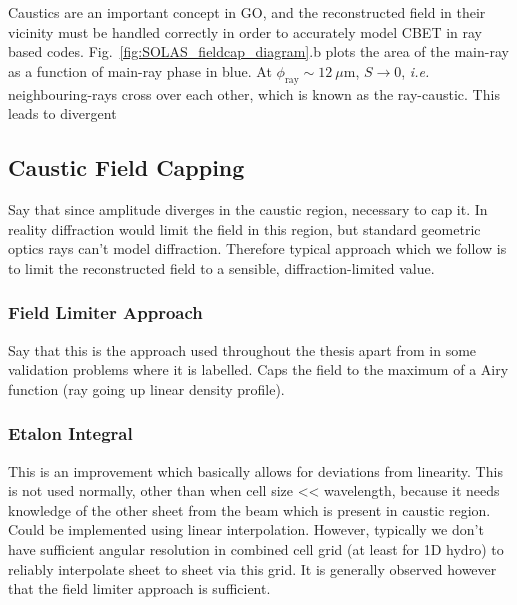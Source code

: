 Caustics are an important concept in \ac{GO}, and the reconstructed field in their vicinity must be handled correctly in order to accurately model \ac{CBET} in ray based codes.
Fig.~\ref{fig:SOLAS_fieldcap_diagram}.b plots the area of the main-ray as a function of main-ray phase in blue.
At $\phi_{\text{ray}}\sim12\ \mu\text{m}$, $S\rightarrow 0$, \textit{i.e.} neighbouring-rays cross over each other, which is known as the ray-caustic.
This leads to divergent 

\subsection{Caustic Field Capping}%
\label{sec:SOLAS_caustics}
Say that since amplitude diverges in the caustic region, necessary to cap it.
In reality diffraction would limit the field in this region, but standard geometric optics rays can't model diffraction.
Therefore typical approach which we follow is to limit the reconstructed field to a sensible, diffraction-limited value.

\subsubsection{Field Limiter Approach}
Say that this is the approach used throughout the thesis apart from in some validation problems where it is labelled.
Caps the field to the maximum of a Airy function (ray going up linear density profile).

\subsubsection{Etalon Integral}
This is an improvement which basically allows for deviations from linearity.
This is not used normally, other than when cell size << wavelength, because it needs knowledge of the other sheet from the beam which is present in caustic region.
Could be implemented using linear interpolation.
However, typically we don't have sufficient angular resolution in combined cell grid (at least for 1D hydro) to reliably interpolate sheet to sheet via this grid.
It is generally observed however that the field limiter approach is sufficient.


